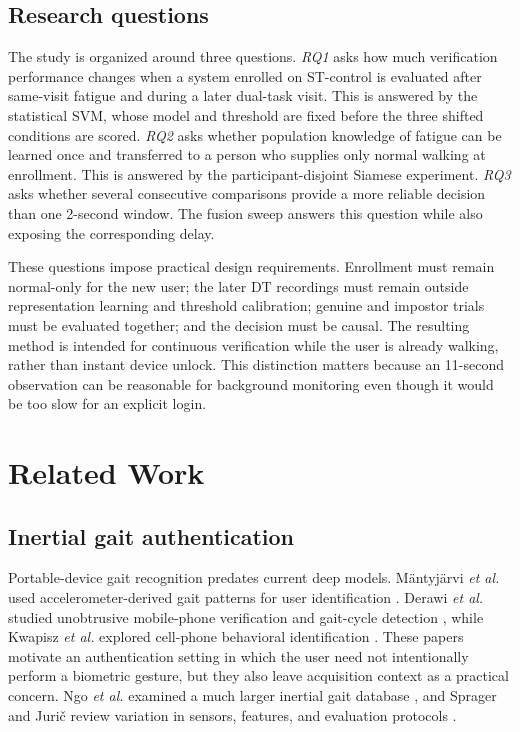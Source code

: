 \documentclass[conference]{IEEEtran}
\begin{document}
\subsection{Research questions}
The study is organized around three questions. \emph{RQ1} asks how much verification performance changes when a system enrolled on ST-control is evaluated after same-visit fatigue and during a later dual-task visit. This is answered by the statistical SVM, whose model and threshold are fixed before the three shifted conditions are scored. \emph{RQ2} asks whether population knowledge of fatigue can be learned once and transferred to a person who supplies only normal walking at enrollment. This is answered by the participant-disjoint Siamese experiment. \emph{RQ3} asks whether several consecutive comparisons provide a more reliable decision than one 2-second window. The fusion sweep answers this question while also exposing the corresponding delay.

These questions impose practical design requirements. Enrollment must remain normal-only for the new user; the later DT recordings must remain outside representation learning and threshold calibration; genuine and impostor trials must be evaluated together; and the decision must be causal. The resulting method is intended for continuous verification while the user is already walking, rather than instant device unlock. This distinction matters because an 11-second observation can be reasonable for background monitoring even though it would be too slow for an explicit login.

\section{Related Work}
\subsection{Inertial gait authentication}
Portable-device gait recognition predates current deep models. M\"antyj\"arvi \emph{et al.} used accelerometer-derived gait patterns for user identification \cite{Mantyjarvi2005}. Derawi \emph{et al.} studied unobtrusive mobile-phone verification and gait-cycle detection \cite{Derawi2010,DerawiCycle2010}, while Kwapisz \emph{et al.} explored cell-phone behavioral identification \cite{Kwapisz2010}. These papers motivate an authentication setting in which the user need not intentionally perform a biometric gesture, but they also leave acquisition context as a practical concern. Ngo \emph{et al.} examined a much larger inertial gait database \cite{Ngo2014}, and Sprager and Juri\v{c} review variation in sensors, features, and evaluation protocols \cite{SpragerReview2015}.
\end{document}
